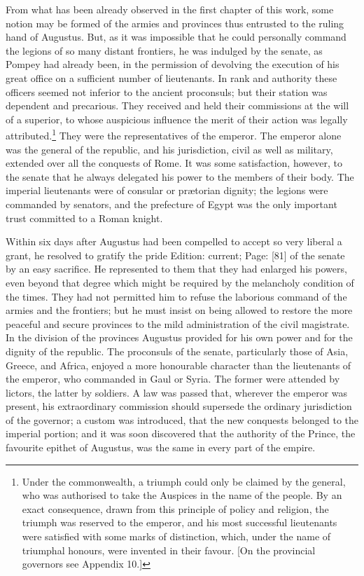 From what has been already observed in the first chapter of this work, some notion may be formed of the armies and provinces thus entrusted to the ruling hand of Augustus. But, as it was impossible that he could personally command the legions of so many distant frontiers, he was indulged by the senate, as Pompey had already been, in the permission of devolving the execution of his great office on a sufficient number of lieutenants. In rank and authority these officers seemed not inferior to the ancient proconsuls; but their station was dependent and precarious. They received and held their commissions at the will of a superior, to whose auspicious influence the merit of their action was legally attributed.\footnote{Under the commonwealth, a triumph could only be claimed by the general, who was authorised to take the Auspices in the name of the people. By an exact consequence, drawn from this principle of policy and religion, the triumph was reserved to the emperor, and his most successful lieutenants were satisfied with some marks of distinction, which, under the name of triumphal honours, were invented in their favour. [On the provincial governors see Appendix 10.]} They were the representatives of the emperor. The emperor alone was the general of the republic, and his jurisdiction, civil as well as military, extended over all the conquests of Rome. It was some satisfaction, however, to the senate that he always delegated his power to the members of their body. The imperial lieutenants were of consular or prætorian dignity; the legions were commanded by senators, and the prefecture of Egypt was the only important trust committed to a Roman knight.

Within six days after Augustus had been compelled to accept so very liberal a grant, he resolved to gratify the pride Edition: current; Page: [81] of the senate by an easy sacrifice. He represented to them that they had enlarged his powers, even beyond that degree which might be required by the melancholy condition of the times. They had not permitted him to refuse the laborious command of the armies and the frontiers; but he must insist on being allowed to restore the more peaceful and secure provinces to the mild administration of the civil magistrate. In the division of the provinces Augustus provided for his own power and for the dignity of the republic. The proconsuls of the senate, particularly those of Asia, Greece, and Africa, enjoyed a more honourable character than the lieutenants of the emperor, who commanded in Gaul or Syria. The former were attended by lictors, the latter by soldiers. A law was passed that, wherever the emperor was present, his extraordinary commission should supersede the ordinary jurisdiction of the governor; a custom was introduced, that the new conquests belonged to the imperial portion; and it was soon discovered that the authority of the Prince, the favourite epithet of Augustus, was the same in every part of the empire.

